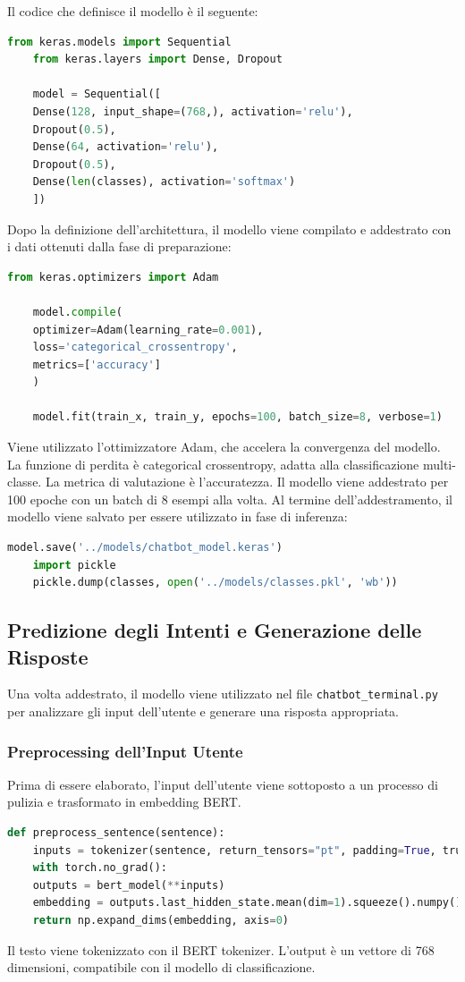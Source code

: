 \documentclass[12pt, letterpaper]{article}
\begin{document}
Il codice che definisce il modello è il seguente:

\begin{lstlisting}[language=Python]
	from keras.models import Sequential
	from keras.layers import Dense, Dropout
	
	model = Sequential([
	Dense(128, input_shape=(768,), activation='relu'),
	Dropout(0.5),
	Dense(64, activation='relu'),
	Dropout(0.5),
	Dense(len(classes), activation='softmax')
	])
\end{lstlisting}
Dopo la definizione dell'architettura, il modello viene compilato e addestrato con i dati ottenuti dalla fase di preparazione:

\begin{lstlisting}[language=Python]
	from keras.optimizers import Adam
	
	model.compile(
	optimizer=Adam(learning_rate=0.001),
	loss='categorical_crossentropy',
	metrics=['accuracy']
	)
	
	model.fit(train_x, train_y, epochs=100, batch_size=8, verbose=1)
\end{lstlisting}
Viene utilizzato l'ottimizzatore Adam, che accelera la convergenza del modello. La funzione di perdita è categorical crossentropy, adatta alla classificazione multi-classe. La metrica di valutazione è l'accuratezza. Il modello viene addestrato per 100 epoche con un batch di 8 esempi alla volta. Al termine dell'addestramento, il modello viene salvato per essere utilizzato in fase di inferenza:

\begin{lstlisting}[language=Python]
	model.save('../models/chatbot_model.keras')
	import pickle
	pickle.dump(classes, open('../models/classes.pkl', 'wb'))
\end{lstlisting}

\subsection{Predizione degli Intenti e Generazione delle Risposte}
Una volta addestrato, il modello viene utilizzato nel file \texttt{chatbot\_terminal.py} per analizzare gli input dell'utente e generare una risposta appropriata.

\subsubsection{Preprocessing dell'Input Utente}
Prima di essere elaborato, l'input dell'utente viene sottoposto a un processo di pulizia e trasformato in embedding BERT.
\begin{lstlisting}[language=Python]
	def preprocess_sentence(sentence):
	inputs = tokenizer(sentence, return_tensors="pt", padding=True, truncation=True, max_length=50)
	with torch.no_grad():
	outputs = bert_model(**inputs)
	embedding = outputs.last_hidden_state.mean(dim=1).squeeze().numpy()
	return np.expand_dims(embedding, axis=0)
\end{lstlisting}
Il testo viene tokenizzato con il BERT tokenizer. L'output è un vettore di 768 dimensioni, compatibile con il modello di classificazione.
\end{document}
